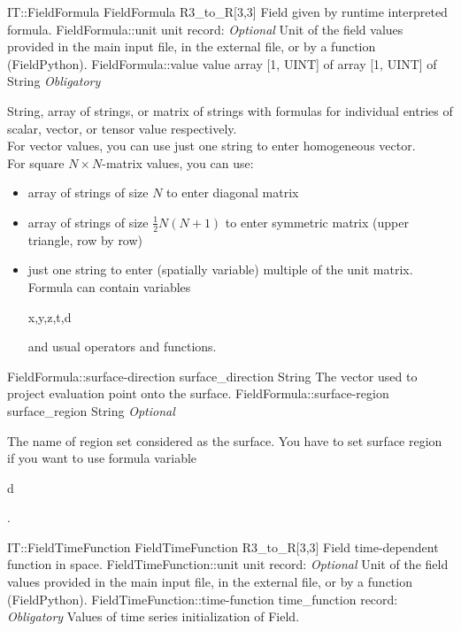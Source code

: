 \begin{RecordType}
	{IT::FieldFormula}
	{FieldFormula}
	{}%
	{}%
	{{{R3{\_}to{\_}R[3,3] Field given by runtime interpreted formula.}%
}}
		\RecKey
			{FieldFormula::unit}
			{unit}
			{{record: }}{}
			{ \it{Optional}}
			{{{Unit of the field values provided in the main input file, in the external file, or by a function (FieldPython).}%
}}
		\RecKey
			{FieldFormula::value}
			{value}
			{{array [1, UINT] of }{array [1, UINT] of }{String}}{}
			{ \it{Obligatory}}
			{{{{String, array of strings, or matrix of strings with formulas for individual entries of scalar, vector, or tensor value respectively.}\\{
For vector values, you can use just one string to enter homogeneous vector.}\\{
For square }{$N\times N$}{-matrix values, you can use:}
% 
}
\begin{itemize}
\item {array of strings of size }{$N$}{ to enter diagonal matrix}
\item {array of strings of size }{$\frac12N(N+1)$}{ to enter symmetric matrix (upper triangle, row by row)}
\item {just one string to enter (spatially variable) multiple of the unit matrix.}\\{
Formula can contain variables }\begin{ttfamily}x,y,z,t,d\end{ttfamily}{ and usual operators and functions.}
\end{itemize}
}}
		\RecKey
			{FieldFormula::surface-direction}
			{surface{\_}direction}
			{{String}}{}
			{ }
			{{{The vector used to project evaluation point onto the surface.}%
}}
		\RecKey
			{FieldFormula::surface-region}
			{surface{\_}region}
			{{String}}{}
			{ \it{Optional}}
			{{{The name of region set considered as the surface.
You have to set surface region if you want to use formula variable }\begin{ttfamily}d\end{ttfamily}{.}%
}}
\end{RecordType}
\begin{RecordType}
	{IT::FieldTimeFunction}
	{FieldTimeFunction}
	{}%
	{}%
	{{{R3{\_}to{\_}R[3,3] Field time-dependent function in space.}%
}}
		\RecKey
			{FieldTimeFunction::unit}
			{unit}
			{{record: }}{}
			{ \it{Optional}}
			{{{Unit of the field values provided in the main input file, in the external file, or by a function (FieldPython).}%
}}
		\RecKey
			{FieldTimeFunction::time-function}
			{time{\_}function}
			{{record: }}{}
			{ \it{Obligatory}}
			{{{Values of time series initialization of Field.}%
}}
\end{RecordType}
